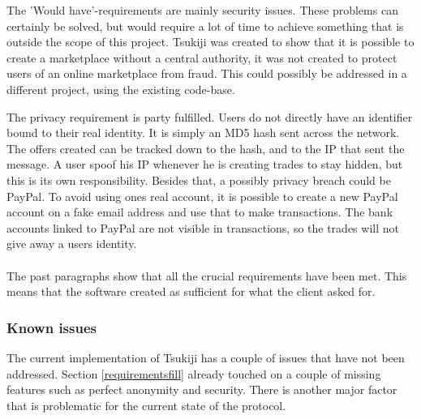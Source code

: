 The 'Would have'-requirements are mainly security issues.
These problems can certainly be solved, but would require a lot of time to achieve something that is outside the scope of this project.
Tsukiji was created to show that it is possible to create a marketplace without a central authority, it was not created to protect users of an online marketplace from fraud.
This could possibly be addressed in a different project, using the existing code-base.

The privacy requirement is party fulfilled. Users do not directly have an identifier bound to their real identity.
It is simply an MD5 hash sent across the network.
The offers created can be tracked down to the hash, and to the IP that sent the message.
A user spoof his IP whenever he is creating trades to stay hidden, but this is its own responsibility.
Besides that, a possibly privacy breach could be PayPal.
To avoid using ones real account, it is possible to create a new PayPal account on a fake email address and use that to make transactions.
The bank accounts linked to PayPal are not visible in transactions, so the trades will not give away a users identity.\\
\\
The past paragraphs show that all the crucial requirements have been met.
This means that the software created as sufficient for what the client asked for.

\subsubsection{Known issues}
\label{knownissues}
The current implementation of Tsukiji has a couple of issues that have not been addressed.
Section \ref{requirementsfill} already touched on a couple of missing features such as perfect anonymity and security.
There is another major factor that is problematic for the current state of the protocol.

